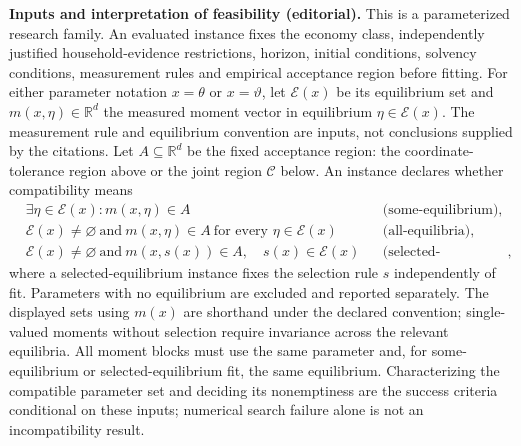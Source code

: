 \documentclass[11pt,a4paper]{article}
\begin{document}
\textbf{Inputs and interpretation of feasibility (editorial).} This is a parameterized research family. An evaluated instance fixes the economy class, independently justified household-evidence restrictions, horizon, initial conditions, solvency conditions, measurement rules and empirical acceptance region before fitting. For either parameter notation \(x=\theta\) or \(x=\vartheta\), let \(\mathcal E(x)\) be its equilibrium set and \(m(x,\eta)\in\mathbb R^d\) the measured moment vector in equilibrium \(\eta\in\mathcal E(x)\). The measurement rule and equilibrium convention are inputs, not conclusions supplied by the citations. Let \(A\subseteq\mathbb R^d\) be the fixed acceptance region: the coordinate-tolerance region above or the joint region \(\mathcal C\) below. An instance declares whether compatibility means
\[
\begin{aligned}
&\exists\eta\in\mathcal E(x):m(x,\eta)\in A
&&\text{(some-equilibrium)},\\
&\mathcal E(x)\ne\varnothing\ \text{and}\ 
  m(x,\eta)\in A\ \text{for every }\eta\in\mathcal E(x)
&&\text{(all-equilibria)},\\
&\mathcal E(x)\ne\varnothing\ \text{and}\ 
  m(x,s(x))\in A,\quad s(x)\in\mathcal E(x)
&&\text{(selected-equilibrium)},
\end{aligned}
\]
where a selected-equilibrium instance fixes the selection rule \(s\) independently of fit. Parameters with no equilibrium are excluded and reported separately. The displayed sets using \(m(x)\) are shorthand under the declared convention; single-valued moments without selection require invariance across the relevant equilibria. All moment blocks must use the same parameter and, for some-equilibrium or selected-equilibrium fit, the same equilibrium. Characterizing the compatible parameter set and deciding its nonemptiness are the success criteria conditional on these inputs; numerical search failure alone is not an incompatibility result.
\end{document}
